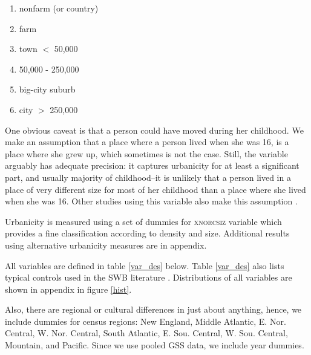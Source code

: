 \documentclass[10pt, letterpaper]{article}
\begin{document}
\begin{spacing}{2.0}
\begin{spacing}{.9}
  \begin{enumerate}
  \item nonfarm (or country)
  \item farm
  \item town $<$ 50,000
  \item 50,000 - 250,000
  \item big-city suburb
  \item city $>$ 250,000
  \end{enumerate}
\end{spacing}
One obvious caveat is that a person could have moved during her childhood.
We make an assumption that a place where a person lived when she was 16, is a
place where she grew up, which sometimes is not the case. Still, the
variable arguably has adequate precision: it captures urbanicity for at least a
significant part, and usually majority of childhood--it is unlikely that
a person lived in a place of very different size for most of her childhood than
a place where she lived when she was 16. 
%
Other studies using this variable also make this  assumption \citep{stephan82, tuch87}.

Urbanicity is measured using a set of dummies for
\textsc{xnorcsiz} variable which provides a fine classification according to
 density and size. {Additional results using alternative urbanicity
   measures are in appendix.}

 
 All variables
are defined in table \ref{var_des} below.  Table \ref{var_des}  also lists  typical
controls used in the SWB  literature  \citep{aok-ls_fisher16,aok11a}.
Distributions of all variables are shown in appendix in figure \ref{hist}. 


\begin{spacing}{.9}

{\footnotesize }
\end{spacing}

Also, there are regional or cultural
differences in just about anything, hence, we include dummies for census
 regions: New England, Middle Atlantic, E. Nor. Central, W. Nor. Central, South
Atlantic, E. Sou. Central, W. Sou. Central, Mountain, and Pacific. Since we use
pooled GSS data, we include year dummies.  




\end{spacing}
\end{document}

